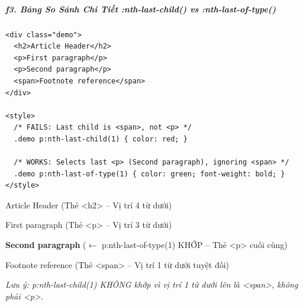 \documentclass[11pt,oneside]{book}
\begin{document}

\subparagraph{f3. Bảng So Sánh Chi Tiết :nth-last-child() vs :nth-last-of-type()}
\mbox{}\par\vspace{2pt}

\begin{codeWindow}
\begin{lstlisting}[language=HTML5]
<div class="demo">
  <h2>Article Header</h2>
  <p>First paragraph</p>
  <p>Second paragraph</p>
  <span>Footnote reference</span>
</div>

<style>
  /* FAILS: Last child is <span>, not <p> */
  .demo p:nth-last-child(1) { color: red; }

  /* WORKS: Selects last <p> (Second paragraph), ignoring <span> */
  .demo p:nth-last-of-type(1) { color: green; font-weight: bold; }
</style>
\end{lstlisting}
\end{codeWindow}

\begin{browserWindow}
\sffamily\small
Article Header {\scriptsize\textcolor{gray!60}{(Thẻ <h2> -- Vị trí 4 từ dưới)}} \par\vspace{2pt}
First paragraph {\scriptsize\textcolor{gray!60}{(Thẻ <p> -- Vị trí 3 từ dưới)}} \par\vspace{2pt}
\textcolor{green!70!black}{\textbf{Second paragraph}} {\scriptsize\textcolor{gray!60}{($\leftarrow$ p:nth-last-of-type(1) KHỚP -- Thẻ <p> cuối cùng)}} \par\vspace{2pt}
Footnote reference {\scriptsize\textcolor{gray!60}{(Thẻ <span> -- Vị trí 1 từ dưới tuyệt đối)}} \par\vspace{4pt}
{\scriptsize\textcolor{gray!60}{\textit{Lưu ý: p:nth-last-child(1) KHÔNG khớp vì vị trí 1 từ dưới lên là <span>, không phải <p>.}}}
\end{browserWindow}
\end{document}
